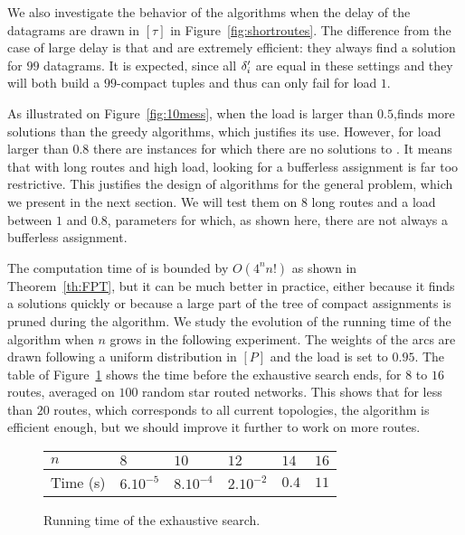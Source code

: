 We also investigate the behavior of the algorithms when the delay of the datagrams are drawn in $[\tau]$ in 
Figure~\ref{fig:shortroutes}. The difference from the case of large delay is that \compactpair and \compactfit are extremely efficient: they always find a solution for $99$ datagrams. It is expected, since all $\delta'_i$ are equal in these settings and they will both build a $99$-compact tuples and thus can only fail for load $1$.


       As illustrated on Figure~\ref{fig:10mess}, when the load is larger than $0.5$,\ESCA finds more solutions than the greedy algorithms, which justifies its use. However, for load larger than $0.8$ there are instances for which there are no solutions to \pazl. It means that with long routes and high load, looking for a bufferless assignment is far too restrictive. This justifies the design of algorithms for the general \pall problem, which we present in the next section. We will test them on $8$ long routes and a load between $1$ and $0.8$, parameters for which, as shown here, there are not always a bufferless assignment.
      
       The computation time of \ESCA is bounded by $O(4^nn!)$ as shown in Theorem~\ref{th:FPT}, but it can be much better in practice, either because it finds a solutions quickly or because a large part of the tree of compact assignments is pruned during the algorithm. We study the evolution of the running time  of the algorithm when $n$ grows in the following experiment. The weights of the arcs are drawn following a uniform distribution in $[P]$ and the load is set to $0.95$.  The table of Figure~\ref{fig:table} shows the time before the exhaustive search ends, for $8$ to $16$ routes, averaged on $100$ random star routed networks. This shows that for less than $20$ routes, which corresponds to all current topologies, the algorithm is efficient enough, but we should improve it further to work on more routes.
       
             \begin{figure}[h]
         \begin{center}
         \begin{tabularx}{0.9\textwidth}{|l|X|X|X|X|X|}
    \hline
   $n$ & $8$ & $10$& $12$&$14$& $16$\\
    \hline
   Time (s) & $6.10^{-5}$&$8.10^{-4}$&$2.10^{-2}$& $0.4$& $11$\\
    \hline
      \end{tabularx}
      \end{center}
      \caption{Running time of the exhaustive search.}
      \label{fig:table}
      \end{figure}

